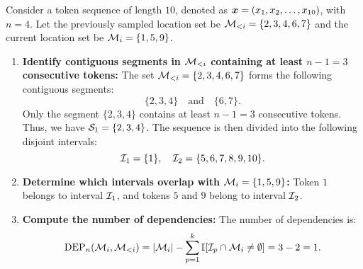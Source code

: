 \begin{example}
    Consider a token sequence of length $10$, denoted as ${\bm{x}} = (x_1, x_2, \dots, x_{10})$, with $n=4$. Let the previously sampled location set be ${\mathcal{M}}_{<i} = \{2, 3, 4, 6, 7\}$ and the current location set be ${\mathcal{M}}_i = \{1, 5, 9\}$.

    \begin{enumerate}
        \item \textbf{Identify contiguous segments in ${\mathcal{M}}_{<i}$ containing at least $n-1 = 3$ consecutive tokens:} The set ${\mathcal{M}}_{<i} = \{2, 3, 4, 6, 7\}$ forms the following contiguous segments:
        \[
        \{2, 3, 4\} \quad \text{and} \quad \{6, 7\}.
        \]
        Only the segment $\{2, 3, 4\}$ contains at least $n-1 = 3$ consecutive tokens. Thus, we have ${\mathcal{S}}_1=\{2,3,4\}$. The sequence is then divided into the following disjoint intervals:
        \[
        {\mathcal{I}}_1 = \{1\}, \quad {\mathcal{I}}_2 = \{5, 6, 7, 8, 9, 10\}.
        \]

        \item \textbf{Determine which intervals overlap with ${\mathcal{M}}_i = \{1, 5, 9\}$:} Token $1$ belongs to interval ${\mathcal{I}}_1$, and tokens $5$ and $9$ belong to interval ${\mathcal{I}}_2$.

        \item \textbf{Compute the number of dependencies:} The number of dependencies is:
        \[
        \operatorname{DEP}_n({\mathcal{M}}_i, {\mathcal{M}}_{<i}) = |{\mathcal{M}}_i| - \sum_{p=1}^k \mathbb{I}[{\mathcal{I}}_p \cap {\mathcal{M}}_i \neq \emptyset] = 3 - 2 = 1.
        \]
    \end{enumerate}
\end{example}

